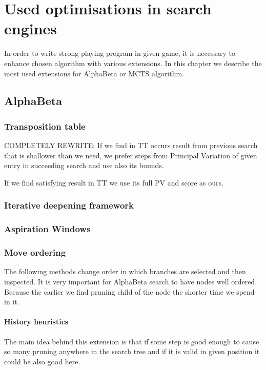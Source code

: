 \chapter{Used optimisations in search engines}

In order to write strong playing program in given game, it is necessary to
enhance chosen algorithm with various extensions. In this chapter we describe
the most used extensions for AlphaBeta or MCTS algorithm.

\section{AlphaBeta}
\subsection{Transposition table}
COMPLETELY REWRITE: If we find in TT occurs result from previous search that is
shallower than we need, we prefer steps from Principal Variation of given entry
in succeeding search and use also its bounds.

If we find satisfying result in TT we use its full PV and score as ours.

\subsection{Iterative deepening framework}
\subsection{Aspiration Windows}
\subsection{Move ordering}
The following methods change order in which branches are selected and then
inspected. It is very important for AlphaBeta search to have nodes well
ordered. Because the earlier we find pruning child of the node the shorter time
we spend in it.
	\subsubsection{History heuristics}
	The main idea behind this extension is that if some step is good enough
	to cause so many pruning anywhere in the search tree and if it is valid in
	given position it could be also good here.

